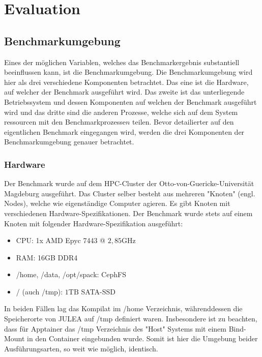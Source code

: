 \chapter{Evaluation}

\section{Benchmarkumgebung}

Eines der möglichen Variablen, welches das Benchmarkergebnis substantiell beeinflussen kann,  ist die Benchmarkumgebung. Die Benchmarkumgebung wird hier als drei verschiedene Komponenten betrachtet. Das eine ist die Hardware, auf welcher der Benchmark ausgeführt wird. Das zweite ist das unterliegende Betriebssystem und dessen Komponenten auf welchen der Benchmark ausgeführt wird und das dritte sind die anderen Prozesse, welche sich auf dem System ressourcen mit den Benchmarkprozesse\(n\) teilen. Bevor detailierter auf den eigentlichen Benchmark eingegangen wird, werden die drei Komponenten der Benchmarkumgebung genauer betrachtet.

\subsection{Hardware}

Der Benchmark wurde auf dem HPC-Cluster der Otto-von-Guericke-Universität Magdeburg ausgeführt. Das Cluster selber besteht aus mehreren "Knoten" (engl. Nodes), welche wie eigenständige Computer agieren. Es gibt Knoten mit verschiedenen Hardware-Spezifikationen. Der Benchmark wurde stets auf einem Knoten mit folgender Hardware-Spezifikation ausgeführt:

\begin{itemize}
    \item CPU: 1x AMD Epyc 7443 @ $2,85\text{GHz}$
    \item RAM: 16GB DDR4
    \item /home, /data, /opt/spack: CephFS
    \item /\*\* (auch /tmp): $1\text{TB}$ SATA-SSD  
\end{itemize}

In beiden Fällen lag das Kompilat im /home Verzeichnis, währenddessen die Speicherorte von JULEA auf /tmp definiert waren. Insbesondere ist zu beachten, dass für Apptainer das /tmp Verzeichnis des "Host" Systems mit einem Bind-Mount in den Container eingebunden wurde. Somit ist hier die Umgebung beider Ausführungsarten, so weit wie möglich, identisch.

